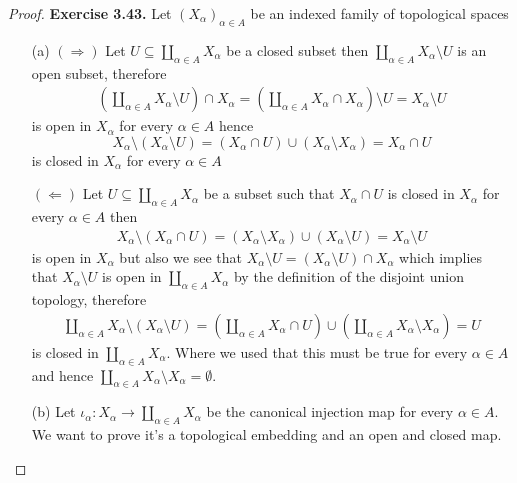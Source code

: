\documentclass[11pt]{article}
\newcommand{\setmin}{\setminus}
\theoremstyle{definition}
\begin{document}
\begin{proof}{\textbf{Exercise 3.43.}}
    Let $(X_\alpha)_{\alpha \in A}$ be an indexed family of topological
    spaces
    \begin{itemize}
        \item [(a)] $(\Rightarrow)$
        Let $U \subseteq \coprod_{\alpha \in A} X_\alpha$
        be a closed subset then $\coprod_{\alpha \in A} X_\alpha \setmin U$
        is an open subset, therefore
        \begin{align*}
            (\coprod_{\alpha \in A} X_\alpha \setmin U) \cap X_\alpha
            = (\coprod_{\alpha \in A} X_\alpha \cap X_\alpha) \setmin U
            = X_\alpha \setmin U
        \end{align*}
        is open in $X_\alpha$ for every $\alpha \in A$ hence
        $$X_\alpha \setmin (X_\alpha \setmin U)
        = (X_\alpha \cap U) \cup (X_\alpha \setmin X_\alpha) = X_\alpha \cap U$$
        is closed in $X_\alpha$ for every $\alpha \in A$

        $(\Leftarrow)$ Let $U \subseteq \coprod_{\alpha \in A} X_\alpha$
        be a subset such that $X_\alpha \cap U$ is closed in $X_\alpha$
        for every $\alpha \in A$ then 
        \begin{align*}
            X_\alpha \setmin (X_\alpha \cap U)
            = (X_\alpha \setmin X_\alpha) \cup (X_\alpha \setmin U)
            = X_\alpha \setmin U
        \end{align*}
        is open in $X_\alpha$ but also we see that
        $X_\alpha \setmin U = (X_\alpha \setmin U) \cap X_\alpha$
        which implies that $X_\alpha \setmin U$ is open in
        $\coprod_{\alpha \in A} X_\alpha$ by the definition of the disjoint
        union topology, therefore
        \begin{align*}
            \coprod_{\alpha \in A} X_\alpha \setmin (X_\alpha \setmin U)
            = (\coprod_{\alpha \in A} X_\alpha \cap U)
            \cup (\coprod_{\alpha \in A} X_\alpha \setmin X_\alpha)
            = U
        \end{align*}
        is closed in $\coprod_{\alpha \in A} X_\alpha$. Where we used that
        this must be true for every $\alpha\in A$ and hence
        $\coprod_{\alpha \in A} X_\alpha \setmin X_\alpha = \emptyset$.

        \item [(b)] Let
        $\iota_\alpha: X_\alpha \to \coprod_{\alpha \in A} X_\alpha$
        be the canonical injection map for every $\alpha \in A$.
        We want to prove it's a topological embedding and an open
        and closed map.


\end{itemize}
\end{proof}
\end{document}

